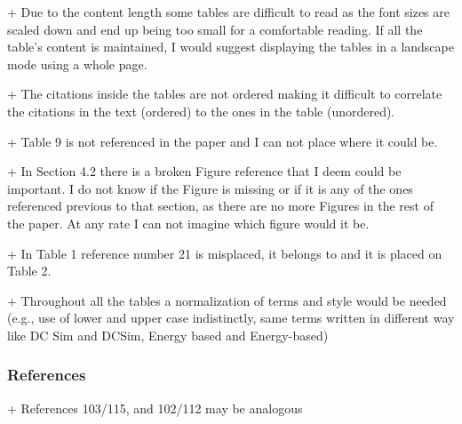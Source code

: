 


+ Due to the content length some tables are difficult to read as the
font sizes are scaled down and end up being too small for a
comfortable reading. If all the table's content is maintained, I would
suggest displaying the tables in a landscape mode using a whole page.


+ The citations inside the tables are not ordered making it difficult
to correlate the citations in the text (ordered) to the ones in the
table (unordered).


+ Table 9 is not referenced in the paper and I can not place where it
could be.


+ In Section 4.2 there is a broken Figure reference that I deem could
be important. I do not know if the Figure is missing or if it is any
of the ones referenced previous to that section, as there are no more
Figures in the rest of the paper. At any rate I can not imagine which
figure would it be.


+ In Table 1 reference number 21 is misplaced, it belongs to and it is
placed on Table 2.


+ Throughout all the tables a normalization of terms and style would
be needed (e.g., use of lower and upper case indistinctly, same terms
written in different way like DC Sim and DCSim,
Energy based and
Energy-based)




\subsubsection{References}

+ References 103/115, and 102/112 may be analogous


